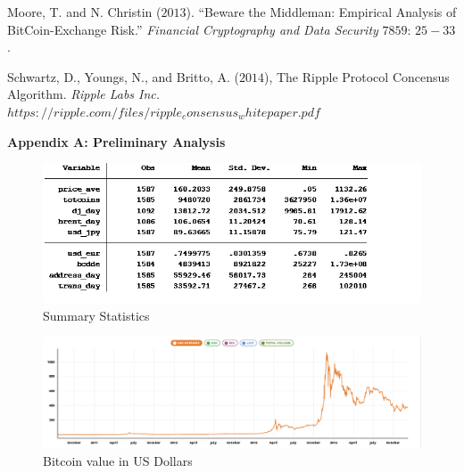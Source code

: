 \documentclass{article}[10 pt]
\newcommand{\vs}{\vspace{0.1in}}
\begin{document}
\vs

Moore, T. and N. Christin ($2013$). “Beware the Middleman: Empirical
Analysis of BitCoin-Exchange Risk.” \textit{Financial Cryptography and Data
Security} $7859$: $25-33$.

\vs

Schwartz, D., Youngs, N., and Britto, A. ($2014$), The Ripple Protocol
Concensus Algorithm. \textit{Ripple Labs Inc.}
$https://ripple.com/files/ripple_consensus_whitepaper.pdf$

\newpage

\textbf{Appendix A: Preliminary Analysis}

\vspace{5mm}

\begin{center}

\begin{figure}

\end{figure}

\end{center}\begin{figure}[ht!]

\centering

\includegraphics[width=150mm]{summary.png}

\caption{Summary Statistics}

\label{overflow}

\end{figure}

\vs

\begin{figure}[ht!]

\centering

\includegraphics[width=150mm]{ave_price.png}

\caption{Bitcoin value in US Dollars}

\label{overflow}

\end{figure}
\end{document}
